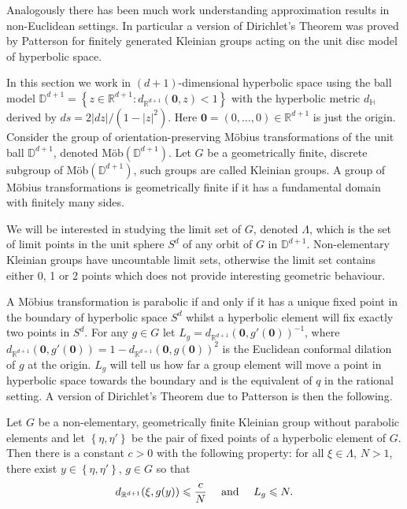 Analogously there has been much work understanding approximation results in non-Euclidean settings. In particular a version of Dirichlet's Theorem was proved by Patterson \cite{patterson} for finitely generated Kleinian groups acting on the unit disc model of hyperbolic space. 

In this section we work in $(d+1)$-dimensional hyperbolic space using the ball model $\mathbb{D}^{d+1} = \left\{ z \in \mathbb{R}^{d+1} \colon d_{\mathbb{R}^{d+1}}(\mathbf{0},z) < 1 \right\}$ with the hyperbolic metric $d_{\mathbb{H}}$ derived by $ds = 2 \lvert dz \rvert / (1 - \lvert z \rvert^2)$. Here $\mathbf{0} = (0,\ldots, 0) \in \mathbb{R}^{d+1}$ is just the origin. Consider the group of orientation-preserving M{\"o}bius transformations of the unit ball $\mathbb{D}^{d+1}$, denoted M{\"o}b$(\mathbb{D}^{d+1})$. Let $G$ be a geometrically finite, discrete subgroup of M{\"o}b$(\mathbb{D}^{d+1})$, such groups are called Kleinian groups. A group of M{\"o}bius transformations is geometrically finite if it has a fundamental domain with finitely many sides. 

We will be interested in studying the limit set of $G$, denoted $\Lambda$, which is the set of limit points in the unit sphere $S^d$ of any orbit of $G$ in $\mathbb{D}^{d+1}$. Non-elementary Kleinian groups have uncountable limit sets, otherwise the limit set contains either 0, 1 or 2 points which does not provide interesting geometric behaviour. 

A M{\"o}bius transformation is parabolic if and only if it has a unique fixed point in the boundary of hyperbolic space $S^d$ whilst a hyperbolic element will fix exactly two points in $S^d$. For any $g \in G$ let $L_g = d_{\mathbb{R}^{d+1}}(\mathbf{0}, g'(\mathbf{0}))^{-1}$, where $d_{\mathbb{R}^{d+1}}(\mathbf{0}, g'(\mathbf{0})) = 1 - d_{\mathbb{R}^{d+1}}(\mathbf{0}, g(\mathbf{0})) ^2$ is the Euclidean conformal dilation of $g$ at the origin. $L_g$ will tell us how far a group element will move a point in hyperbolic space towards the boundary and is the equivalent of $q$ in the rational setting. A version of Dirichlet's Theorem due to Patterson is then the following.

\begin{theorem}
Let $G$ be a non-elementary, geometrically finite Kleinian group without parabolic elements and let $\left\{ \eta, \eta' \right\}$ be the pair of fixed points of a hyperbolic element of $G$. Then there is a constant $c > 0$ with the following property: for all $\xi \in \Lambda$, $N > 1$, there exist
$y \in \left\{ \eta, \eta'\right\}$, $g \in G$ so that
\[
d_{\mathbb{R}^{d+1}}(\xi, g(y)) \le \frac{c}{N} \quad \textup{ and } \quad L_g \le N.
\]
\end{theorem}

